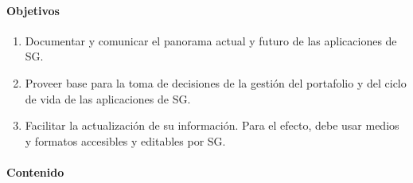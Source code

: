 \documentclass[
	a4paper, %
	12pt, %
]{include/CSSullivanBusinessReport}
\def\tightlist{}
\begin{document}
\paragraph{Objetivos}\label{sec:objetivos}

\begin{enumerate}
\def\labelenumi{\arabic{enumi}.}
\tightlist
\item
  Documentar y comunicar el panorama actual y futuro de las aplicaciones
  de SG.
\item
  Proveer base para la toma de decisiones de la gestión del portafolio y
  del ciclo de vida de las aplicaciones de SG.
\item
  Facilitar la actualización de su información. Para el efecto, debe
  usar medios y formatos accesibles y editables por SG.
\end{enumerate}

\paragraph{Contenido}\label{sec:contenido}
\end{document}

